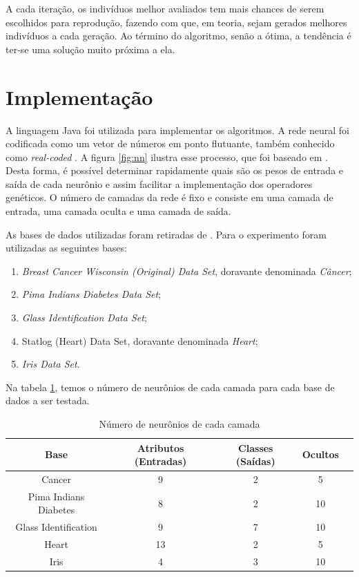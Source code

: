 \documentclass[12pt]{article}
\begin{document}
\par A cada iteração, os indivíduos melhor avaliados tem mais chances de serem escolhidos para reprodução, fazendo com que, em teoria, sejam gerados melhores indivíduos a cada geração. Ao término do algoritmo, senão a ótima, a tendência é ter-se uma solução muito próxima a ela.


\section{Implementação}\label{sec:imple}

\par A linguagem Java foi utilizada para implementar os algoritmos. A rede neural foi codificada como um vetor de números em ponto flutuante, também conhecido como \textit{real-coded} \cite{Liu}. A figura \ref{fig:nn} ilustra esse processo, que foi baseado em \cite{montana}. Desta forma, é possível determinar rapidamente quais são os pesos de entrada e saída de cada neurônio e assim facilitar a implementação dos o\-pe\-ra\-do\-res genéticos. O número de camadas da rede é fixo e consiste em uma camada de entrada, uma camada oculta e uma camada de saída. 

\par  As bases de dados utilizadas foram retiradas de \cite{frank}. Para o experimento foram utilizadas as seguintes bases:

\begin{enumerate}
	\item \textit{Breast Cancer Wisconsin (Original) Data Set}, doravante denominada \textit{Câncer};
	\item \textit{Pima Indians Diabetes Data Set};
	\item \textit{Glass Identification Data Set};
	\item Statlog (Heart) Data Set, doravante denominada \textit{Heart};
	\item \textit{Iris Data Set}.
\end{enumerate}

\par Na tabela \ref{tab:params}, temos o número de neurônios de cada camada para cada base de dados a ser testada.

\begin{table}[h]
	\center
	\begin{tabular}{|c|c|c|c|c|}
		\hline Base  & Atributos (Entradas) & Classes (Saídas) & Ocultos \\ 
		\hline Cancer & 9 & 2 & 5 \\ 
		\hline Pima Indians Diabetes & 8 & 2 & 10 \\ 
		\hline Glass Identification & 9 & 7 & 10 \\ 
		\hline Heart & 13 & 2 & 5 \\ 
		\hline Iris & 4 & 3 & 10 \\ 
		\hline 
	\end{tabular}
	\caption{Número de neurônios de cada camada}
	\label{tab:params}
\end{table} 
\end{document}
